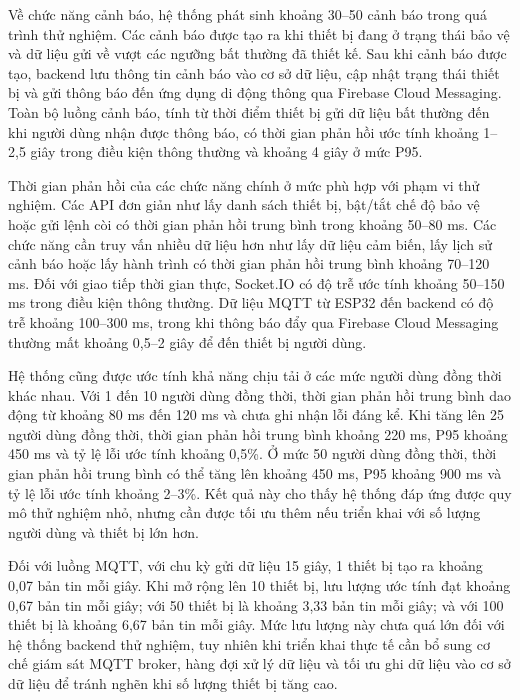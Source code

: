 \documentclass[../DoAn.tex]{subfiles}
\begin{document}
Về chức năng cảnh báo, hệ thống phát sinh khoảng 30--50 cảnh báo trong quá trình thử nghiệm. Các cảnh báo được tạo ra khi thiết bị đang ở trạng thái bảo vệ và dữ liệu gửi về vượt các ngưỡng bất thường đã thiết kế. Sau khi cảnh báo được tạo, backend lưu thông tin cảnh báo vào cơ sở dữ liệu, cập nhật trạng thái thiết bị và gửi thông báo đến ứng dụng di động thông qua Firebase Cloud Messaging. Toàn bộ luồng cảnh báo, tính từ thời điểm thiết bị gửi dữ liệu bất thường đến khi người dùng nhận được thông báo, có thời gian phản hồi ước tính khoảng 1--2,5 giây trong điều kiện thông thường và khoảng 4 giây ở mức P95.

Thời gian phản hồi của các chức năng chính ở mức phù hợp với phạm vi thử nghiệm. Các API đơn giản như lấy danh sách thiết bị, bật/tắt chế độ bảo vệ hoặc gửi lệnh còi có thời gian phản hồi trung bình trong khoảng 50--80 ms. Các chức năng cần truy vấn nhiều dữ liệu hơn như lấy dữ liệu cảm biến, lấy lịch sử cảnh báo hoặc lấy hành trình có thời gian phản hồi trung bình khoảng 70--120 ms. Đối với giao tiếp thời gian thực, Socket.IO có độ trễ ước tính khoảng 50--150 ms trong điều kiện thông thường. Dữ liệu MQTT từ ESP32 đến backend có độ trễ khoảng 100--300 ms, trong khi thông báo đẩy qua Firebase Cloud Messaging thường mất khoảng 0,5--2 giây để đến thiết bị người dùng.

Hệ thống cũng được ước tính khả năng chịu tải ở các mức người dùng đồng thời khác nhau. Với 1 đến 10 người dùng đồng thời, thời gian phản hồi trung bình dao động từ khoảng 80 ms đến 120 ms và chưa ghi nhận lỗi đáng kể. Khi tăng lên 25 người dùng đồng thời, thời gian phản hồi trung bình khoảng 220 ms, P95 khoảng 450 ms và tỷ lệ lỗi ước tính khoảng 0,5\%. Ở mức 50 người dùng đồng thời, thời gian phản hồi trung bình có thể tăng lên khoảng 450 ms, P95 khoảng 900 ms và tỷ lệ lỗi ước tính khoảng 2--3\%. Kết quả này cho thấy hệ thống đáp ứng được quy mô thử nghiệm nhỏ, nhưng cần được tối ưu thêm nếu triển khai với số lượng người dùng và thiết bị lớn hơn.

Đối với luồng MQTT, với chu kỳ gửi dữ liệu 15 giây, 1 thiết bị tạo ra khoảng 0,07 bản tin mỗi giây. Khi mở rộng lên 10 thiết bị, lưu lượng ước tính đạt khoảng 0,67 bản tin mỗi giây; với 50 thiết bị là khoảng 3,33 bản tin mỗi giây; và với 100 thiết bị là khoảng 6,67 bản tin mỗi giây. Mức lưu lượng này chưa quá lớn đối với hệ thống backend thử nghiệm, tuy nhiên khi triển khai thực tế cần bổ sung cơ chế giám sát MQTT broker, hàng đợi xử lý dữ liệu và tối ưu ghi dữ liệu vào cơ sở dữ liệu để tránh nghẽn khi số lượng thiết bị tăng cao.
\end{document}
